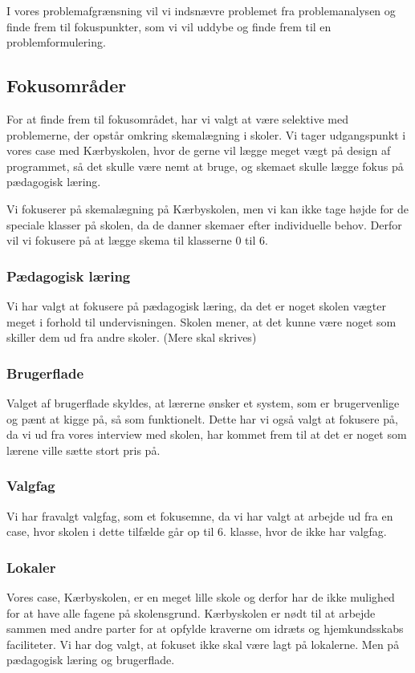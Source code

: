
I vores problemafgrænsning vil vi indsnævre problemet fra problemanalysen og finde frem til fokuspunkter, som vi vil uddybe og finde frem til en problemformulering.

\subsection*{Fokusområder}
For at finde frem til fokusområdet, har vi valgt at være selektive med problemerne, der opstår omkring skemalægning i skoler. Vi tager udgangspunkt i vores case med Kærbyskolen, hvor de gerne vil lægge meget vægt på design af programmet, så det skulle være nemt at bruge, og skemaet skulle lægge fokus på pædagogisk læring. 

Vi fokuserer på skemalægning på Kærbyskolen, men vi kan ikke tage højde for de speciale klasser på skolen, da de danner skemaer efter individuelle behov. Derfor vil vi fokusere på at lægge skema til klasserne 0 til 6.

\subsubsection*{Pædagogisk læring}
Vi har valgt at fokusere på pædagogisk læring, da det er noget skolen vægter meget i forhold til undervisningen. Skolen mener, at det kunne være noget som skiller dem ud fra andre skoler.
(Mere skal skrives)

\subsubsection*{Brugerflade}
Valget af brugerflade skyldes, at lærerne ønsker et system, som er brugervenlige og pænt at kigge på, så som funktionelt. Dette har vi også valgt at fokusere på, da vi ud fra vores interview med skolen, har kommet frem til at det er noget som lærene ville sætte stort pris på.

\subsubsection*{Valgfag}
Vi har fravalgt valgfag, som et fokusemne, da vi har valgt at arbejde ud fra en case, hvor skolen i dette tilfælde går op til 6. klasse, hvor de ikke har valgfag.

\subsubsection*{Lokaler}
Vores case, Kærbyskolen, er en meget lille skole og derfor  har de ikke mulighed for at have alle fagene på skolensgrund. Kærbyskolen er nødt til at arbejde sammen med andre parter for at opfylde kraverne om idræts og hjemkundsskabs faciliteter. Vi har dog valgt, at fokuset ikke skal være lagt på lokalerne. Men på pædagogisk læring og brugerflade.

